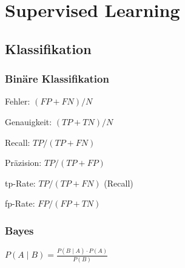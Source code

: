 \section*{Supervised Learning}

\subsection*{Klassifikation}

\subsubsection*{Binäre Klassifikation}
Fehler: $(FP + FN) / N$

Genauigkeit: $(TP + TN) / N$

Recall: $TP / (TP + FN)$

Präzision: $TP / (TP + FP)$

tp-Rate: $TP / (TP + FN)$ (Recall)

fp-Rate: $FP / (FP + TN)$

\subsubsection*{Bayes}
$\displaystyle P(A \mid B) = \frac{P(B \mid A) \cdot P(A)}{P(B)}$
